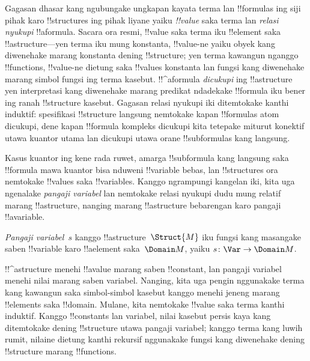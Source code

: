 \documentclass[../../../include/open-logic-section]{subfiles}
\begin{document}


\begin{explain}
Gagasan dhasar kang ngubungake ungkapan kayata terma lan
!!{formula}s ing siji pihak karo !!{structure}s ing pihak liyane
yaiku \emph{!!{value}} saka terma lan \emph{relasi nyukupi}
!!a{formula}. Sacara ora resmi, !!{value} saka terma iku !!{element}
saka !!a{structure}---yen terma iku mung konstanta, !!{value}-ne
yaiku obyek kang diwenehake marang konstanta dening !!{structure};
yen terma kawangun nganggo !!{function}s, !!{value}-ne dietung saka
!!{value}s konstanta lan fungsi kang diwenehake marang simbol fungsi
ing terma kasebut. !!^a{formula} \emph{dicukupi} ing !!a{structure}
yen interpretasi kang diwenehake marang predikat ndadekake
!!{formula} iku bener ing ranah !!{structure} kasebut. Gagasan
relasi nyukupi iki ditemtokake kanthi induktif: spesifikasi
!!{structure} langsung nemtokake kapan !!{formula}s atom dicukupi,
dene kapan !!{formula} kompleks dicukupi kita tetepake miturut
konektif utawa kuantor utama lan dicukupi utawa orane
!!{subformula}s kang langsung.

Kasus kuantor ing kene rada ruwet, amarga !!{subformula} kang
langsung saka !!{formula} mawa kuantor bisa nduweni !!{variable} bebas,
lan !!{structure}s ora nemtokake !!{value}s saka !!{variable}s.
Kanggo ngrampungi kangelan iki, kita uga ngenalake \emph{pangaji
variabel} lan nemtokake relasi nyukupi
dudu mung relatif marang !!a{structure}, nanging marang
!!a{structure} bebarengan karo pangaji !!a{variable}.
\end{explain}

\begin{defn}
\emph{Pangaji variabel}~$s$ kanggo !!a{structure}~$\Struct{M}$
iku fungsi kang masangake saben !!{variable} karo
!!a{element} saka~$\Domain M$, yaiku
$s\colon \Var \to \Domain M$.
\end{defn}

\begin{explain}
!!^a{structure} menehi !!a{value} marang saben !!{constant},
lan pangaji variabel menehi nilai marang saben variabel.
Nanging, kita uga pengin nggunakake terma kang kawangun saka
simbol-simbol kasebut kanggo menehi jeneng marang !!{element}s
saka !!{domain}. Mulane, kita nemtokake !!{value} saka terma
kanthi induktif. Kanggo !!{constant}s lan variabel, nilai kasebut
persis kaya kang ditemtokake dening !!{structure} utawa pangaji
variabel; kanggo terma kang luwih rumit, nilaine dietung kanthi
rekursif nggunakake fungsi kang diwenehake dening !!{structure}
marang !!{function}s.
\end{explain}
\end{document}
